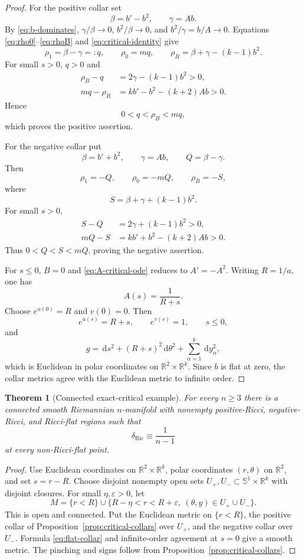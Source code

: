 \documentclass[11pt,reqno]{amsart}
\newtheorem{theorem}{Theorem}[section]
\theoremstyle{definition}
\theoremstyle{remark}
\newcommand{\dd}{\,\mathrm d}
\newcommand{\R}{\mathbb R}
\newcommand{\Sph}{\mathbb S}
\newcommand{\dric}{\delta_{\mathrm{Ric}}}
\newcommand{\eps}{\varepsilon}
\begin{document}
\begin{proof}
For the positive collar set
\[
\beta=b'-b^2,
\qquad
\gamma=Ab.
\]
By \eqref{eq:b-dominates}, $\gamma/\beta\to0$, $b^2/\beta\to0$, and $b^2/\gamma=b/A\to0$.  Equations \eqref{eq:rho0}--\eqref{eq:rhoB} and \eqref{eq:critical-identity} give
\[
\rho_1=\beta-\gamma=:q,
\qquad
\rho_0=mq,
\qquad
\rho_B=\beta+\gamma-(k-1)b^2.
\]
For small $s>0$, $q>0$ and
\begin{align*}
\rho_B-q&=2\gamma-(k-1)b^2>0,\\
mq-\rho_B&=kb'-b^2-(k+2)Ab>0.
\end{align*}
Hence
\[
0<q<\rho_B<mq,
\]
which proves the positive assertion.

For the negative collar put
\[
\beta=b'+b^2,
\qquad
\gamma=Ab,
\qquad
Q=\beta-\gamma.
\]
Then
\[
\rho_1=-Q,
\qquad
\rho_0=-mQ,
\qquad
\rho_B=-S,
\]
where
\[
S=\beta+\gamma+(k-1)b^2.
\]
For small $s>0$,
\begin{align*}
S-Q&=2\gamma+(k-1)b^2>0,\\
mQ-S&=kb'+b^2-(k+2)Ab>0.
\end{align*}
Thus $0<Q<S<mQ$, proving the negative assertion.

For $s\le0$, $B=0$ and \eqref{eq:A-critical-ode} reduces to $A'=-A^2$.  Writing $R=1/a$, one has
\[
A(s)=\frac1{R+s}.
\]
Choose $e^{u(0)}=R$ and $v(0)=0$.  Then
\[
e^{u(s)}=R+s,
\qquad e^{v(s)}=1,
\qquad s\le0,
\]
and
\begin{equation}\label{eq:flat-collar}
g=\dd s^2+(R+s)^2\dd\theta^2+\sum_{\alpha=1}^k\dd y_\alpha^2,
\end{equation}
which is Euclidean in polar coordinates on $\R^2\times\R^k$.  Since $b$ is flat at zero, the collar metrics agree with the Euclidean metric to infinite order.
\end{proof}

\begin{theorem}[Connected exact-critical example]\label{thm:critical-local}
For every $n\ge3$ there is a connected smooth Riemannian $n$-manifold with nonempty positive-Ricci, negative-Ricci, and Ricci-flat regions such that
\[
\dric\equiv\frac1{n-1}
\]
at every non-Ricci-flat point.
\end{theorem}

\begin{proof}
Use Euclidean coordinates on $\R^2\times\R^k$, polar coordinates $(r,\theta)$ on $\R^2$, and set $s=r-R$.  Choose disjoint nonempty open sets $U_+,U_-\subset\Sph^1\times\R^k$ with disjoint closures.  For small $\eta,\eps>0$, let
\[
M=\{r<R\}\cup
\{R-\eta<r<R+\eps,\ (\theta,y)\in U_+\cup U_-\}.
\]
This is open and connected.  Put the Euclidean metric on $\{r<R\}$, the positive collar of Proposition~\ref{prop:critical-collars} over $U_+$, and the negative collar over $U_-$.  Formula \eqref{eq:flat-collar} and infinite-order agreement at $s=0$ give a smooth metric.  The pinching and signs follow from Proposition~\ref{prop:critical-collars}.
\end{proof}
\end{document}
